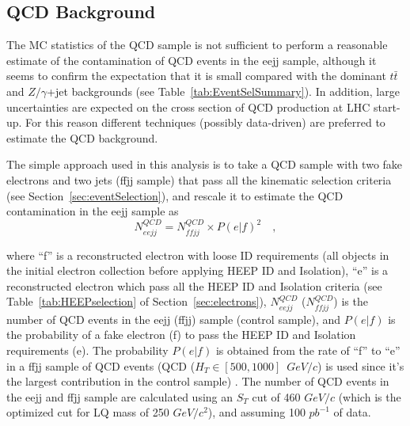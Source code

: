 \documentclass{cmspaper}
\begin{document}
\begin{linenumbers}
%
%

\subsection{QCD Background} \label{sec:QCDBackground}

The MC statistics of the QCD sample is not sufficient to perform a reasonable estimate of the contamination 
of QCD events in the eejj sample, although it seems to confirm the expectation that it is small compared with 
the dominant $t\bar{t}$ and $Z/\gamma$+jet backgrounds (see Table~\ref{tab:EventSelSummary}). 
In addition, large uncertainties are expected on the cross section of QCD production at LHC start-up.
For this reason different techniques (possibly data-driven) are preferred to estimate the QCD background.

The simple approach used in this analysis is to take a QCD sample with two fake electrons and two jets (ffjj sample)
that pass all the kinematic selection criteria (see Section~\ref{sec:eventSelection}), and rescale it to estimate 
the QCD contamination in the eejj sample as
%
\begin{equation} \label{QCDRescaling}
N_{eejj}^{QCD} = N_{ffjj}^{QCD} \times {P(e|f)}^2 \quad , 
\end{equation}
%

where ``f'' is a reconstructed electron with loose ID requirements (all objects in the initial electron collection 
before applying HEEP ID and Isolation), 
``e'' is a reconstructed electron which pass all the HEEP ID and Isolation criteria (see Table~\ref{tab:HEEPselection} 
of Section~\ref{sec:electrons}), 
$N_{eejj}^{QCD}$ ($N_{ffjj}^{QCD}$) is the number of QCD events in the eejj (ffjj) sample (control sample), 
and $P(e|f)$ is the probability of a fake electron (f) to pass the HEEP ID and Isolation requirements (e).
The probability $P(e|f)$ is obtained from the rate of ``f'' to ``e'' in a ffjj sample of QCD events 
(QCD ($H_T\in[500,1000]$~$GeV/c$) is used since it's the largest contribution in the control sample) .
The number of QCD events in the eejj and ffjj sample are calculated using 
an $S_{T}$ cut of 460 $GeV/c$ (which is the optimized cut for LQ mass of 250 $GeV/c^2$), and assuming 100 $pb^{-1}$ of data.


\end{linenumbers}
\end{document}
